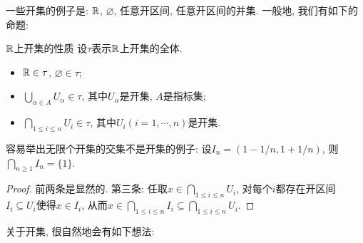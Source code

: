 一些开集的例子是: $\mathbb{R}$, $\varnothing$, 任意开区间, 任意开区间的并集. 一般地, 我们有如下的命题: 

\begin{proposition}{$\mathbb{R}$上开集的性质}
	设$\tau$表示$\mathbb{R}$上开集的全体. 
	\begin{itemize}
		\item $\mathbb{R} \in \tau$, $\varnothing \in \tau$; 
		\item $\bigcup_{\alpha \in A} U_{\alpha} \in \tau$, 其中$U_{\alpha}$是开集, $A$是指标集; 
		\item $\bigcap_{1 \leq i \leq n} U_i \in \tau$, 其中$U_i(i=1,\cdots ,n)$是开集. 
	\end{itemize}
\end{proposition}
\begin{remark}
	容易举出无限个开集的交集不是开集的例子: 设$I_n=(1-1/n,1+1/n)$, 则$\bigcap_{n\geq 1}I_n = \{ 1 \}$. 
\end{remark}
\begin{proof}
	前两条是显然的. 第三条: 任取$x \in \bigcap_{1 \leq i \leq n} U_i$, 对每个$i$都存在开区间$I_i \subseteq U_i$使得$x \in I_i$, 从而$x \in \bigcap_{1 \leq i \leq n} I_i \subseteq \bigcap_{1 \leq i \leq n} U_i$. 
\end{proof}

关于开集, 很自然地会有如下想法: 

